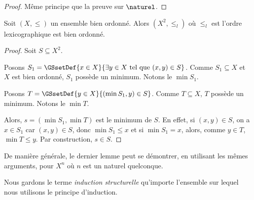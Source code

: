 \begin{proof}
  Même principe que la preuve sur $\naturel$.
\end{proof}

\begin{lemma}
  Soit $(X, \leq)$ un ensemble bien ordonné. Alors $(X^{2}, \leq_{l})$ où
  $\leq_{l}$ est l'ordre lexicographique est bien ordonné.
\end{lemma}

\begin{proof}
  Soit $S \subseteq X^{2}$.

  Posons $S_{1} = \GSsetDef{x \in X}{\exists y \in X \text{ tel que } (x, y) \in S}$.
  Comme $S_{1} \subseteq X$ et $X$ est bien ordonné, $S_{1}$ possède un minimum.
  Notons le $\min{S_{1}}$.

  Posons $T = \GSsetDef{y \in X}{(\min{S_{1}}, y) \in S}$. Comme $T \subseteq
  X$, $T$ possède un minimum. Notons le $\min{T}$.

  Alors, $s = (\min{S_{1}}, \min{T})$ est le minimum de $S$. En effet, si $(x, y)
  \in S$, on a $x \in S_{1}$ car $(x, y) \in S$, donc $\min{S_{1}} \leq x$ et si
  $\min{S_{1}} = x$, alors, comme $y \in T$, $\min{T} \leq y$. Par construction,
  $s \in S$.
\end{proof}

De manière générale, le dernier lemme peut se démontrer, en utilisant les mêmes
arguments, pour $X^{n}$ où $n$ est un naturel quelconque.

Nous gardons le terme \textit{induction structurelle} qu'importe l'ensemble sur
lequel nous utilisons le principe d'induction.